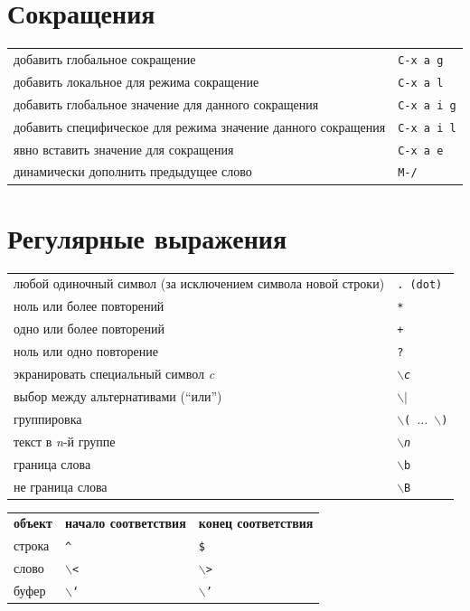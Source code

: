 \documentclass[10pt]{article}
\newlength{\ColWidth}
\newlength{\ColThreeWidth}
\newcommand{\kbd}[1]{\texttt{#1}}
\begin{document}
\section{Сокращения}

\begin{tabular}{p{\ColWidth}l}
добавить глобальное сокращение & \kbd{C-x a g} \\
добавить локальное для режима сокращение & \kbd{C-x a l} \\
добавить глобальное значение для данного сокращения & \kbd{C-x a i g} \\
добавить специфическое для режима значение данного сокращения & \kbd{C-x a i l} \\
явно вставить значение для сокращения & \kbd{C-x a e} \\

динамически дополнить предыдущее слово & \kbd{M-/} \\
\end{tabular}

\section{Регулярные выражения}

\begin{tabular}{p{\ColWidth}l}
любой одиночный символ (за исключением символа новой строки) & \kbd{. {\rm(dot)}} \\
ноль или более повторений & \kbd{*} \\
одно или более повторений & \kbd{+} \\
ноль или одно повторение & \kbd{?} \\
экранировать специальный символ {\it c\/} & \kbd{$\backslash${\it c}} \\
выбор между альтернативами (``или'') & \kbd{$\backslash|$} \\
группировка & \kbd{$\backslash$( {\rm$\ldots$} $\backslash$)} \\
текст в {\it n\/}-й группе & \kbd{$\backslash${\it n}} \\
граница слова & \kbd{$\backslash$b} \\
не граница слова & \kbd{$\backslash$B} \\
\end{tabular}

\begin{tabular}{p{\ColWidth}p{\ColThreeWidth}p{\ColThreeWidth}}
{\bf объект} & {\bf начало соответствия} & {\bf конец соответствия} \\
строка & \kbd{\^} & \kbd{\$} \\
слово & \kbd{$\backslash$<} & \kbd{$\backslash$>} \\
буфер & \kbd{$\backslash$`} & \kbd{$\backslash$'} \\
\end{tabular}
\end{document}
